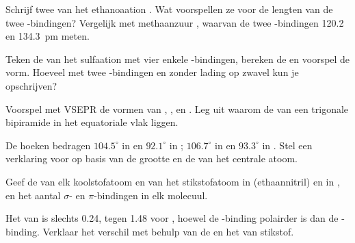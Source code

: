 \begin{exercise}[$\star\star$]\label{exo:b1:lewis-resonance-vsepr:5}
Schrijf twee  van het ethanoaation . Wat
voorspellen ze voor de lengten van de twee -bindingen? Vergelijk
met methaanzuur , waarvan de twee -bindingen 120.2 en
\qty{134.3}{pm} meten.
\end{exercise}


\begin{exercise}[$\star\star$]\label{exo:b1:lewis-resonance-vsepr:6}
Teken de  van het sulfaation  met vier
enkele -bindingen, bereken de  en voorspel de
vorm. Hoeveel  met twee -bindingen en zonder
lading op zwavel kun je opschrijven?
\end{exercise}

\begin{exercise}[$\star\star$]\label{exo:b1:lewis-resonance-vsepr:7}
Voorspel met VSEPR de vormen van , ,  en
. Leg uit waarom de  van een trigonale bipiramide in
het equatoriale vlak liggen.
\end{exercise}

\begin{exercise}[$\star\star$]\label{exo:b1:lewis-resonance-vsepr:8}
De hoeken  bedragen $104.5^\circ$ in  en $92.1^\circ$
in ; $106.7^\circ$ in  en $93.3^\circ$ in . Stel
een verklaring voor op basis van de grootte en de 
van het centrale atoom.
\end{exercise}


\begin{exercise}[$\star\star$]\label{exo:b1:lewis-resonance-vsepr:9}
Geef de  van elk koolstofatoom en van het stikstofatoom in
 (ethaannitril) en in , en het aantal
$\sigma$- en $\pi$-bindingen in elk molecuul.
\end{exercise}

\begin{exercise}[$\star\star\star$]\label{exo:b1:lewis-resonance-vsepr:10}
Het  van  is slechts \qty{0.24}{\debye}, tegen
\qty{1.48}{\debye} voor , hoewel de -binding polairder
is dan de -binding. Verklaar het verschil met behulp van de
 en het  van stikstof.
\end{exercise}


